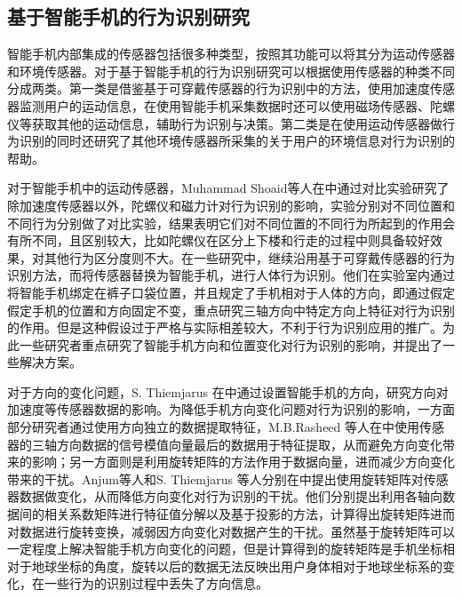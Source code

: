 \subsection{基于智能手机的行为识别研究}
\par 智能手机内部集成的传感器包括很多种类型，按照其功能可以将其分为运动传感器和环境传感器。对于基于智能手机的行为识别研究可以根据使用传感器的种类不同分成两类。第一类是借鉴基于可穿戴传感器的行为识别中的方法，使用加速度传感器监测用户的运动信息，在使用智能手机采集数据时还可以使用磁场传感器、陀螺仪等获取其他的运动信息，辅助行为识别与决策。第二类是在使用运动传感器做行为识别的同时还研究了其他环境传感器所采集的关于用户的环境信息对行为识别的帮助。
\par 对于智能手机中的运动传感器，Muhammad Shoaid等人在\cite{diffSensors}中通过对比实验研究了除加速度传感器以外，陀螺仪和磁力计对行为识别的影响，实验分别对不同位置和不同行为分别做了对比实验，结果表明它们对不同位置的不同行为所起到的作用会有所不同，且区别较大，比如陀螺仪在区分上下楼和行走的过程中则具备较好效果，对其他行为区分度则不大。在一些研究中，继续沿用基于可穿戴传感器的行为识别方法，而将传感器替换为智能手机，进行人体行为识别\cite{fixPositionandOrientation1}\cite{fixPositionandOrientation2}。他们在实验室内通过将智能手机绑定在裤子口袋位置，并且规定了手机相对于人体的方向，即通过假定假定手机的位置和方向固定不变，重点研究三轴方向中特定方向上特征对行为识别的作用。但是这种假设过于严格与实际相差较大，不利于行为识别应用的推广。为此一些研究者重点研究了智能手机方向和位置变化对行为识别的影响，并提出了一些解决方案。
\par 对于方向的变化问题，S. Thiemjarus 在\cite{orientationProblem}中通过设置智能手机的方向，研究方向对加速度等传感器数据的影响。为降低手机方向变化问题对行为识别的影响，一方面部分研究者通过使用方向独立的数据提取特征，M.B.Rasheed 等人在\cite{fixOrientationData}中使用传感器的三轴方向数据的信号模值向量最后的数据用于特征提取，从而避免方向变化带来的影响；另一方面则是利用旋转矩阵的方法作用于数据向量，进而减少方向变化带来的干扰。Anjum等人和S. Thiemjarus 等人分别在\cite{orientationTransation1}\cite{orientationTransation2}中提出使用旋转矩阵对传感器数据做变化，从而降低方向变化对行为识别的干扰。他们分别提出利用各轴向数据间的相关系数矩阵进行特征值分解以及基于投影的方法，计算得出旋转矩阵进而对数据进行旋转变换，减弱因方向变化对数据产生的干扰。虽然基于旋转矩阵可以一定程度上解决智能手机方向变化的问题，但是计算得到的旋转矩阵是手机坐标相对于地球坐标的角度，旋转以后的数据无法反映出用户身体相对于地球坐标系的变化，在一些行为的识别过程中丢失了方向信息。
